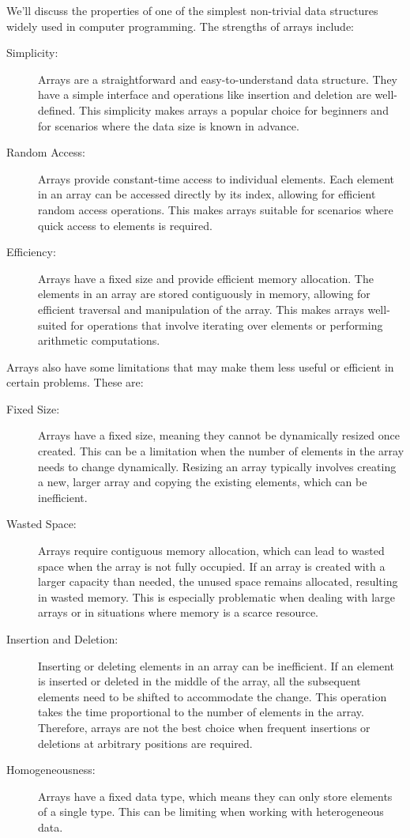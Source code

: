 We'll discuss the properties of \dash one of the simplest non-trivial data structures widely used in computer programming.
The strengths of arrays include:
\begin{description}
    \item[Simplicity:] Arrays are a straightforward and easy-to-understand data structure.
    They have a simple interface and operations like insertion and deletion are well-defined.
    This simplicity makes arrays a popular choice for beginners and for scenarios where the data size is known in advance.
    \item[Random Access:] Arrays provide constant-time access to individual elements.
    Each element in an array can be accessed directly by its index, allowing for efficient random access operations.
    This makes arrays suitable for scenarios where quick access to elements is required.
    \item[Efficiency:] Arrays have a fixed size and provide efficient memory allocation.
    The elements in an array are stored contiguously in memory, allowing for efficient traversal and manipulation of the array.
    This makes arrays well-suited for operations that involve iterating over elements or performing arithmetic computations.
\end{description}

Arrays also have some limitations that may make them less useful or efficient in certain problems.
These are:
\begin{description}
    \item[Fixed Size:] Arrays have a fixed size, meaning they cannot be dynamically resized once created.
    This can be a limitation when the number of elements in the array needs to change dynamically.
    Resizing an array typically involves creating a new, larger array and copying the existing elements, which can be inefficient.
    \item[Wasted Space:] Arrays require contiguous memory allocation, which can lead to wasted space when the array is not fully occupied.
    If an array is created with a larger capacity than needed, the unused space remains allocated, resulting in wasted memory.
    This is especially problematic when dealing with large arrays or in situations where memory is a scarce resource.
    \item[Insertion and Deletion:] Inserting or deleting elements in an array can be inefficient.
    If an element is inserted or deleted in the middle of the array, all the subsequent elements need to be shifted to accommodate the change.
    This operation takes the time proportional to the number of elements in the array.
    Therefore, arrays are not the best choice when frequent insertions or deletions at arbitrary positions are required.
    \item[Homogeneousness:] Arrays have a fixed data type, which means they can only store elements of a single type.
    This can be limiting when working with heterogeneous data.
\end{description}
